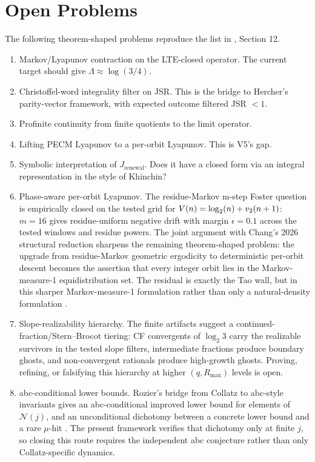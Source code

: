 \section{Open Problems}

The following theorem-shaped problems reproduce the list in
, Section 12.

\begin{enumerate}
\item Markov/Lyapunov contraction on the LTE-closed operator.  The current
target should give \(\Lambda\approx\log(3/4)\).
\item Christoffel-word integrality filter on JSR.  This is the bridge to
Hercher's parity-vector framework, with expected outcome filtered JSR \(<1\).
\item Profinite continuity from finite quotients to the limit operator.
\item Lifting PECM Lyapunov to a per-orbit Lyapunov.  This is V5's gap.
\item Symbolic interpretation of \(J_{\mathrm{renewal}}\).  Does it have a
closed form via an integral representation in the style of Khinchin?
\item Phase-aware per-orbit Lyapunov.  The residue-Markov m-step Foster
question is empirically closed on the tested grid for
\(V(n)=\log_2(n)+v_2(n+1)\): \(m=16\) gives residue-uniform negative drift
with margin \(\epsilon=0.1\) across the tested windows and residue powers.  The
joint argument with Chang's 2026 structural reduction
\cite{chang2026reduction} sharpens the remaining theorem-shaped problem: the
upgrade from residue-Markov geometric ergodicity to deterministic per-orbit
descent becomes the assertion that every integer orbit lies in the
Markov-measure-1 equidistribution set.  The residual is exactly the Tao wall,
but in this sharper Markov-measure-1 formulation rather than only a
natural-density formulation \cite{tao2019almost}.
\item Slope-realizability hierarchy.  The finite artifacts suggest a
continued-fraction/Stern--Brocot tiering: CF convergents of \(\log_2 3\) carry
the realizable survivors in the tested slope filters, intermediate fractions
produce boundary ghosts, and non-convergent rationals produce high-growth
ghosts.  Proving, refining, or falsifying this hierarchy at higher
\((q,R_{\max})\) levels is open.
\item abc-conditional lower bounds.  Rozier's bridge from Collatz to
abc-style invariants gives an abc-conditional improved lower bound for
elements of \(\mathcal{N}(j)\), and an unconditional dichotomy between a concrete
lower bound and a rare \(\mu\)-hit \cite{rozier2023abc}.  The present
framework verifies that dichotomy only at finite \(j\), so closing this route
requires the independent abc conjecture rather than only Collatz-specific
dynamics.
\end{enumerate}

